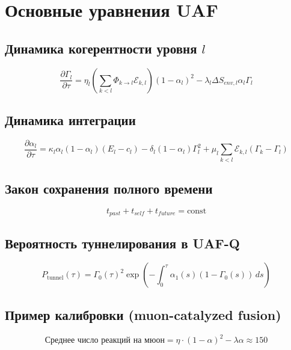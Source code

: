 \documentclass{article}
\begin{document}
\section{Основные уравнения UAF}

\subsection{Динамика когерентности уровня $l$}
\[
\frac{\partial \Gamma_l}{\partial \tau} = \eta_l \left( \sum_{k<l} \Phi_{k\to l} \mathcal{E}_{k,l} \right) (1-\alpha_l)^2 
- \lambda_l \Delta S_{env,l} \alpha_l \Gamma_l
\]

\subsection{Динамика интеграции}
\[
\frac{\partial \alpha_l}{\partial \tau} = \kappa_l \alpha_l (1-\alpha_l)(E_l - c_l) - \delta_l(1-\alpha_l)\Gamma_l^2 
+ \mu_l \sum_{k<l} \mathcal{E}_{k,l}(\Gamma_k - \Gamma_l)
\]

\subsection{Закон сохранения полного времени}
\[
t_{past} + t_{self} + t_{future} = \text{const}
\]

\subsection{Вероятность туннелирования в UAF-Q}
\[
P_{\text{tunnel}}(\tau) = \Gamma_0(\tau)^2 \exp\left(-\int_0^\tau \alpha_1(s)(1-\Gamma_0(s))\,ds\right)
\]

\subsection{Пример калибровки (muon-catalyzed fusion)}
\[
\text{Среднее число реакций на мюон} = \eta \cdot (1-\alpha)^2 - \lambda \alpha \approx 150
\]
\end{document}
